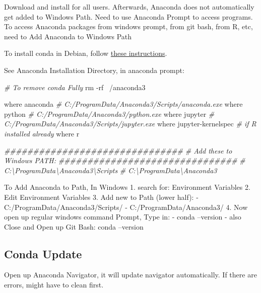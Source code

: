 \documentclass[]{article}
\newenvironment{Shaded}{\begin{snugshade}}{\end{snugshade}}
\newcommand{\CommentTok}[1]{\textcolor[rgb]{0.56,0.35,0.01}{\textit{#1}}}
\newcommand{\ExtensionTok}[1]{#1}
\newcommand{\FunctionTok}[1]{\textcolor[rgb]{0.00,0.00,0.00}{#1}}
\newcommand{\NormalTok}[1]{#1}
\begin{document}
Download and install for all users. Afterwards, Anaconda does not
automatically get added to Windows Path. Need to use Anaconda Prompt to
access programs. To access Anaconda packages from windows prompt, from
git bash, from R, etc, need to Add Anaconda to Windows Path

To install conda in Debian, follow
\href{https://fanwangecon.github.io/Tex4Econ/nontex/install/linux/fn_ubuntu.html}{these
instructions}.

See Anaconda Installation Directory, in anaconda prompt:

\begin{Shaded}
\begin{Highlighting}[]
\CommentTok{# To remove conda Fully}
\FunctionTok{rm}\NormalTok{ -rf ~/anaconda3}

\ExtensionTok{where}\NormalTok{ anaconda}
\CommentTok{# C:/ProgramData/Anaconda3/Scripts/anaconda.exe}
\ExtensionTok{where}\NormalTok{ python}
\CommentTok{# C:/ProgramData/Anaconda3/python.exe}
\ExtensionTok{where}\NormalTok{ jupyter}
\CommentTok{# C:/ProgramData/Anaconda3/Scripts/jupyter.exe}
\ExtensionTok{where}\NormalTok{ jupyter-kernelspec}
\CommentTok{# if R installed already}
\ExtensionTok{where}\NormalTok{ r}

\CommentTok{###############################}
\CommentTok{# Add these to Windows PATH:}
\CommentTok{###############################}
\CommentTok{# C:\textbackslash{}ProgramData\textbackslash{}Anaconda3\textbackslash{}Scripts}
\CommentTok{# C:\textbackslash{}ProgramData\textbackslash{}Anaconda3}
\end{Highlighting}
\end{Shaded}

To Add Anaconda to Path, In Windows 1. search for: Environment Variables
2. Edit Environment Variables 3. Add new to Path (lower half): -
C:/ProgramData/Anaconda3/Scripts/ - C:/ProgramData/Anaconda3/ 4. Now
open up regular windows command Prompt, Type in: - conda --version -
also Close and Open up Git Bash: conda --version

\hypertarget{conda-update}{%
\subsection{Conda Update}\label{conda-update}}

Open up Anaconda Navigator, it will update navigator automatically. If
there are errors, might have to clean first.
\end{document}
